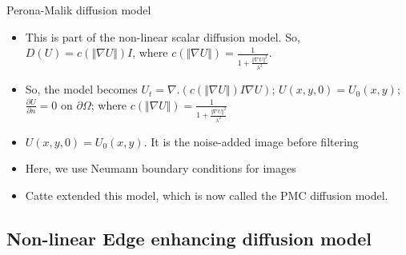 \documentclass{beamer}
\begin{document}
\begin{frame}{Perona-Malik diffusion model}
  \begin{itemize}
  \item {
    This is part of the non-linear scalar diffusion model. So, $D\left(U\right)=c\left(\Vert\nabla U\Vert\right)I$, where $c\left(\Vert\nabla U\Vert\right)=\frac{1}{1+\frac{\Vert\nabla U\Vert^{2}}{\lambda^{2}}}$.
    \pause %
  }
  \item {   
    So, the model becomes $U_{t}=\nabla.\left(c\left(\Vert\nabla U\Vert\right)I\nabla U\right)$;
$U\left(x,y,0\right)=U_{0}\left(x,y\right)$; $\frac{\partial U}{\partial n}=0$
on $\partial\Omega$; where $c\left(\Vert\nabla U\Vert\right)=\frac{1}{1+\frac{\Vert\nabla U\Vert^{2}}{\lambda^{2}}}$ 
    \pause
  }
  \item<3-> {
    $U\left(x,y,0\right)=U_{0}\left(x,y\right)$. It is the noise-added image before filtering
    \pause
  }
  \item<4-> {
    Here, we use Neumann boundary conditions for images
    \pause
  }
  \item<5-> {
    Catte extended this model, which is now called the PMC diffusion model. 
  }
  \end{itemize}
\end{frame}


\subsection{Non-linear Edge enhancing diffusion model}
\end{document}
